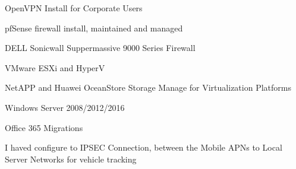 \begin{cventries}
{\begin{cvitems}
        \item {OpenVPN Install for Corporate Users}
        \item {pfSense firewall install, maintained and managed}
        \item {DELL Sonicwall Suppermassive 9000 Series Firewall}
        \item {VMware ESXi and HyperV}
        \item {NetAPP and Huawei OceanStore Storage Manage for Virtualization Platforms}
        \item {Windows Server 2008/2012/2016}
        \item {Office 365 Migrations}
        \item {I haved configure to IPSEC Connection, between the Mobile APNs to Local Server Networks for vehicle tracking}
      \end{cvitems} 
    }
\end{cventries}